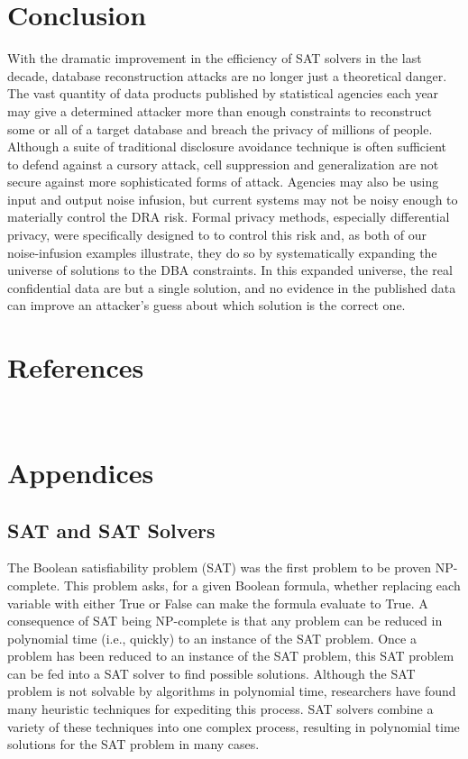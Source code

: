 \documentclass[runningheads]{llncs}
\begin{document}
\section{Conclusion}

With the dramatic improvement in the efficiency of SAT solvers in the
last decade, database reconstruction attacks are no longer just a 
theoretical danger. The vast quantity of data products published by
statistical agencies each year may give a determined attacker 
more than enough constraints to reconstruct some or all of a target database and
breach the privacy of millions of people. Although a suite of traditional
disclosure avoidance technique is often sufficient to defend against a cursory attack, cell suppression and generalization are not secure against more sophisticated
forms of attack. Agencies may also be using input and output noise infusion, but 
current systems may not be noisy enough to materially control the DRA risk.
Formal privacy methods, especially differential privacy, were specifically
designed to to control this risk and, as both of our noise-infusion examples
illustrate, they do so by systematically expanding the universe of solutions
to the DBA constraints. In this expanded universe, the real confidential data
are but a single solution, and no evidence in the published data can improve 
an attacker's guess about which solution is the correct one.

\section{References}\




\section{Appendices}

\subsection{SAT and SAT Solvers}

The Boolean satisfiability problem (SAT) was the first
problem to be proven NP-complete\cite{cooklevin}. This problem asks,
for a given Boolean formula, whether replacing each variable with
either True or False can make the formula evaluate to True.  A
consequence of SAT being NP-complete is that any problem can be
reduced in polynomial time (i.e., quickly) to an instance of the SAT
problem. Once a problem has been reduced to an instance of the SAT
problem, this SAT problem can be fed into a SAT solver to find
possible solutions. Although the SAT problem is not solvable by
algorithms in polynomial time, researchers have found many heuristic
techniques for expediting this process. SAT solvers combine a variety
of these techniques into one complex process, resulting in polynomial
time solutions for the SAT problem in many cases.
\end{document}
